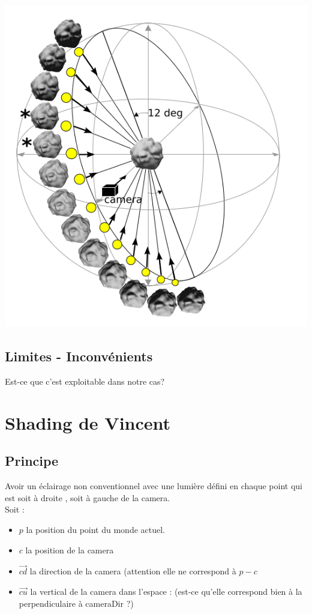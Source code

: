 \documentclass[a4paper]{article}
\begin{document}
\begin{center}
\includegraphics[scale=0.5]{LightDirection.png}
\end{center}

\subsection{Limites - Inconvénients}
Est-ce que c'est exploitable dans notre cas?


\section{Shading de Vincent}
\subsection{Principe}
Avoir un éclairage non conventionnel avec une lumière défini en chaque point qui est soit à droite , soit à gauche de la camera. 
\\
Soit : \\
\begin{itemize}
\item $p$ la position du point du monde actuel.
\item $c$ la position de la camera
\item $\vec{cd}$ la direction de la camera (attention elle ne correspond à $p-c$
\item $\vec{cu}$ la vertical de la camera dans l'espace : (est-ce qu'elle correspond bien à la perpendiculaire à cameraDir ?) 
\end{itemize}  
\end{document}
